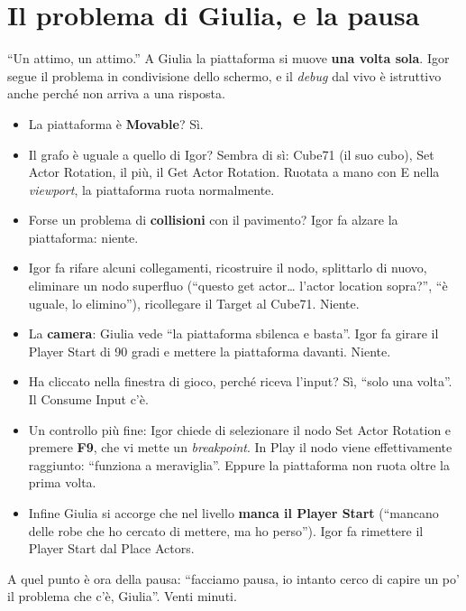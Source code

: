 \section{Il problema di Giulia, e la pausa}
\label{ue2:sec:problema}

``Un attimo, un attimo.'' A Giulia la piattaforma si muove \textbf{una volta sola}. Igor
segue il problema in condivisione dello schermo, e il \emph{debug} dal vivo è istruttivo anche
perché non arriva a una risposta.
\begin{itemize}
  \item La piattaforma è \textbf{Movable}? Sì.
  \item Il grafo è uguale a quello di Igor? Sembra di sì: Cube71 (il suo cubo), Set
        Actor Rotation, il più, il Get Actor Rotation. Ruotata a mano con E nella
        \emph{viewport}, la piattaforma ruota normalmente.
  \item Forse un problema di \textbf{collisioni} con il pavimento? Igor fa alzare la
        piattaforma: niente.
  \item Igor fa rifare alcuni collegamenti, ricostruire il nodo, splittarlo di nuovo,
        eliminare un nodo superfluo (``questo get actor\ldots{} l'actor location
        sopra?'', ``è uguale, lo elimino''), ricollegare il Target al Cube71. Niente.
  \item La \textbf{camera}: Giulia vede ``la piattaforma sbilenca e basta''. Igor fa
        girare il Player Start di 90 gradi e mettere la piattaforma davanti. Niente.
  \item Ha cliccato nella finestra di gioco, perché riceva l'input? Sì, ``solo una
        volta''. Il Consume Input c'è.
  \item Un controllo più fine: Igor chiede di selezionare il nodo Set Actor Rotation e
        premere \textbf{F9}, che vi mette un \emph{breakpoint}. In Play il nodo viene
        effettivamente raggiunto: ``funziona a meraviglia''. Eppure la piattaforma non
        ruota oltre la prima volta.
  \item Infine Giulia si accorge che nel livello \textbf{manca il Player Start}
        (``mancano delle robe che ho cercato di mettere, ma ho perso''). Igor fa
        rimettere il Player Start dal Place Actors.
\end{itemize}
A quel punto è ora della pausa: ``facciamo pausa, io intanto cerco di capire un po' il
problema che c'è, Giulia''. Venti minuti.

